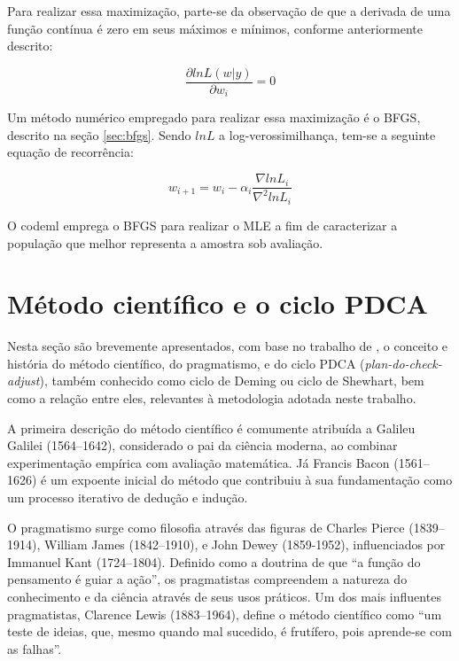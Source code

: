 \documentclass[cic,tc]{iiufrgs}
\begin{document}
Para realizar essa maximização, parte-se da observação de que a derivada de uma
função contínua é zero em seus máximos e mínimos, conforme anteriormente
descrito:

$$ \frac{\partial ln L(w|y)}{\partial w_i} = 0 $$


Um método numérico empregado para realizar essa maximização é o BFGS, descrito
na seção \ref{sec:bfgs}. Sendo $lnL$ a log-verossimilhança, tem-se a seguinte
equação de recorrência:

$$ w_{i+1} = w_i - \alpha_i \frac{\nabla lnL_i}{\nabla^2 lnL_i} $$

O codeml emprega o BFGS para realizar o MLE a fim de caracterizar a população
que melhor representa a amostra sob avaliação.


\section{Método científico e o ciclo PDCA}
\label{sec:pdca}

Nesta seção são brevemente apresentados, com base no trabalho de
\cite{moen2006evolution}, o conceito e história do método científico, do
pragmatismo, e do ciclo PDCA (\textit{plan-do-check-adjust}), também conhecido
como ciclo de Deming ou ciclo de Shewhart, bem como a relação entre eles,
relevantes à metodologia adotada neste trabalho.

A primeira descrição do método científico é comumente atribuída a Galileu
Galilei (1564--1642), considerado o pai da ciência moderna, ao combinar
experimentação empírica com avaliação matemática. Já Francis Bacon (1561--1626)
é um expoente inicial do método que contribuiu à sua fundamentação como um
processo iterativo de dedução e indução.

O pragmatismo surge como filosofia através das figuras de Charles Pierce
(1839--1914), William James (1842--1910), e John Dewey (1859-1952),
influenciados por Immanuel Kant (1724--1804). Definido como a doutrina de que
``a função do pensamento é guiar a ação'', os pragmatistas compreendem a
natureza do conhecimento e da ciência através de seus usos práticos. Um dos
mais influentes pragmatistas, Clarence Lewis (1883--1964), define o método
científico como ``um teste de ideias, que, mesmo quando mal sucedido, é
frutífero, pois aprende-se com as falhas''. 
\end{document}
